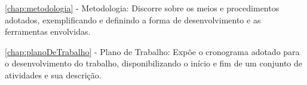 \autoref{chap:metodologia} - Metodologia: Discorre sobre os meios e procedimentos adotados, exemplificando e definindo a forma de desenvolvimento e as ferramentas envolvidas.

\autoref{chap:planoDeTrabalho} - Plano de Trabalho: Expõe o cronograma adotado para o desenvolvimento do trabalho, disponibilizando o início e fim de um conjunto de atividades e sua descrição.

